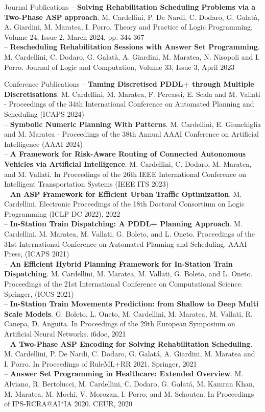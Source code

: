 \documentclass{resume} %
\begin{document}
\begin{rSection}{Journal Publications}
-- \textbf{Solving Rehabilitation Scheduling Problems via a Two-Phase ASP approach}. M. Cardellini, P. De Nardi, C. Dodaro, G. Galat\`a, A. Giardini, M. Maratea, I. Porro. Theory and Practice of Logic Programming, Volume 24, Issue 2, March 2024, pp. 344-367\\
-- \textbf{Rescheduling Rehabilitation Sessions with Answer Set Programming}. M. Cardellini, C. Dodaro, G. Galat\`a, A. Giardini, M. Maratea, N. Nisopoli and I. Porro. Journal of Logic and Computation, Volume 33, Issue 3, April 2023
\end{rSection}
\begin{rSection}{Conference Publications}
-- \textbf{Taming Discretised PDDL+ through Multiple Discretisations}. M. Cardellini, M. Maratea, F. Percassi, E. Scala and M. Vallati - Proceedings of the 34th International Conference on Automated Planning and Scheduling (ICAPS 2024)\\
-- \textbf{Symbolic Numeric Planning With Patterns}. M. Cardellini, E. Giunchiglia and M. Maratea - Proceedings of the 38th Annual AAAI Conference on Artificial Intelligence (AAAI 2024) \\
-- \textbf{A Framework for Risk-Aware Routing of Connected Autonomous Vehicles via Artificial Intelligence}. M. Cardellini, C. Dodaro, M. Maratea, and M. Vallati. In Proceedings of the 26th IEEE International Conference on Intelligent Transportation Systems (IEEE ITS 2023) \\
-- \textbf{An ASP Framework for Efficient Urban Traffic Optimization}. M. Cardellini. Electronic Proceedings of the 18th Doctoral Consortium on Logic Programming (ICLP DC 2022), 2022 \\
-- \textbf{In-Station Train Dispatching: A PDDL+ Planning Approach}. M. Cardellini, M. Maratea, M. Vallati, G. Boleto, and L. Oneto. Proceedings of the 31st International Conference on Automated Planning and Scheduling. AAAI Press, (ICAPS 2021) \\
-- \textbf{An Efficient Hybrid Planning Framework for In-Station Train Dispatching}. M. Cardellini, M. Maratea, M. Vallati, G. Boleto, and L. Oneto. Proceedings of the 21st International Conference on Computational Science. Springer, (ICCS 2021) \\
-- \textbf{In-Station Train Movements Prediction: from Shallow to Deep Multi Scale Models}. G. Boleto, L. Oneto, M. Cardellini, M. Maratea, M. Vallati, R. Canepa, D. Anguita. In Proceedings of the 29th European Symposium on Artificial Neural Networks. i6doc, 2021\\
-- \textbf{A Two-Phase ASP Encoding for Solving Rehabilitation Scheduling}. M. Cardellini, P. De Nardi, C. Dodaro, G. Galat\'a, A. Giardini, M. Maratea and I. Porro. In Proceedings of RuleML+RR 2021. Springer, 2021\\
-- \textbf{Answer Set Programming in Healthcare: Extended Overview}. M. Alviano, R. Bertolucci, M. Cardellini, C. Dodaro, G. Galat\'a, M. Kamran Khan, M. Maratea, M. Mochi, V. Morozan, I. Porro, and M. Schouten. In Proceedings of IPS-RCRA@AI*IA 2020. CEUR, 2020
\end{rSection}
\end{document}
